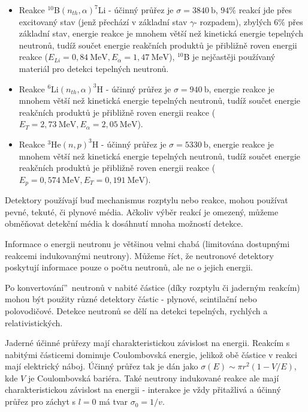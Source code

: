\documentclass[../../main.tex]{subfiles}
\begin{document}
\begin{itemize}
	\item Reakce $^{10}$B$(n_{th}, \alpha)^{7}$Li - účinný průřez je $\sigma = 3840 ~\mathrm{b}$, $94 \%$ reakcí jde přes excitovaný stav (jenž přechází v základní stav $\gamma$- rozpadem), zbylých $6 \%$ přes základní stav, energie reakce je mnohem větší než kinetická energie tepelných neutronů, tudíž součet energie reakčních produktů je přibližně roven energii reakce ($E_{Li} = 0,84 ~\mathrm{MeV}, E_{\alpha} = 1,47 ~\mathrm{MeV}$), $^{10}$B je nejčastěji používaný materiál pro detekci tepelných neutronů.
	\item Reakce $^{6}$Li$(n_{th}, \alpha)^{3}$H - účinný průřez je  $\sigma = 940 ~\mathrm{b}$, energie reakce je mnohem větší než kinetická energie tepelných neutronů, tudíž součet energie reakčních produktů  je přibližně roven energii reakce ($E_T = 2,73 ~\mathrm{MeV}, E_{\alpha} = 2,05 ~\mathrm{MeV}$).
	\item Reakce $^{3}$He$(n,p)^{3}$H - účinný průřez je  $\sigma = 5330 ~\mathrm{b}$, energie reakce je mnohem větší než kinetická energie tepelných neutronů, tudíž součet energie reakčních produktů  je přibližně roven energii reakce ($E_p = 0,574 ~\mathrm{MeV}, E_T = 0,191 ~\mathrm{MeV}$).
\end{itemize}


Detektory používají buď mechanismus rozptylu nebo reakce, mohou používat pevné, tekuté, či plynové média. Ačkoliv výběr reakcí je omezený, můžeme obměňovat detekční média k dosáhnutí mnoha možností detekce. 

Informace o energii neutronu je většinou velmi chabá (limitována dostupnými reakcemi indukovanými neutrony). Můžeme říct, že neutronové detektory poskytují informace pouze o počtu neutronů, ale ne o jejich energii.

Po \quotedblbase konvertování\textquotedblright ~neutronů v nabité částice (díky rozptylu či jaderným reakcím) mohou být použity různé detektory částic - plynové, scintilační nebo polovodičové. Detekce neutronů se dělí na detekci tepelných, rychlých a relativistických. 

Jaderné účinné průřezy mají charakteristickou závislost na energii. Reakcím s nabitými částicemi dominuje Coulombovská energie, jelikož obě částice v reakci mají elektrický náboj. Účinný průřez tak je dán jako $\sigma (E) \sim \pi r^2 (1 - V/E)$, kde $V$ je Coulombovská bariéra. Také neutrony indukované reakce ale mají charakteristickou závislost na energii - interakce je vždy přitažlivá a účinný průřez pro záchyt s $l=0$ má tvar $\sigma _0 = 1/v$. 
\end{document}
